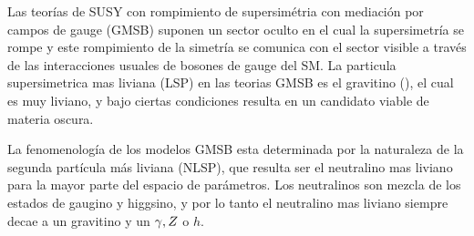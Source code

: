 Las teorías de SUSY con rompimiento de supersimétria con mediación por campos de gauge (GMSB) \cite{Dine:1981gu,AlvarezGaume:1981wy,Nappi:1982hm,Dine:1993yw,Dine:1994vc,Dine:1995ag}
suponen un sector oculto en el cual la supersimetría se rompe y este rompimiento
de la simetría se comunica con el sector visible a través de las interacciones
usuales de bosones de gauge del SM.
La particula
supersimetrica mas liviana (LSP) en las teorias GMSB es el gravitino (\gravino),
el cual es muy liviano, y bajo ciertas condiciones resulta en un candidato
viable de materia oscura.


La fenomenología de los modelos GMSB esta determinada por la naturaleza de la segunda
partícula más liviana (NLSP), que resulta ser el neutralino mas liviano {\ninoone} para
la mayor parte del espacio de parámetros.
Los neutralinos son mezcla de los estados de gaugino y higgsino, y por lo tanto el
neutralino mas liviano siempre decae a un gravitino y un $\gamma, Z$ o $h$.


